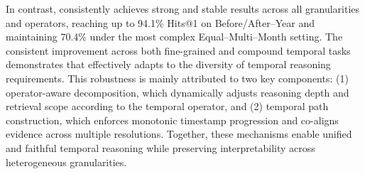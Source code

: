 In contrast, \mot consistently achieves strong and stable results across all granularities and operators, reaching up to 94.1\% Hits@1 on Before/After–Year and maintaining 70.4\% under the most complex Equal–Multi–Month setting.
The consistent improvement across both fine-grained and compound temporal tasks demonstrates that \mot effectively adapts to the diversity of temporal reasoning requirements.  
This robustness is mainly attributed to two key components: (1) operator-aware decomposition, which dynamically adjusts reasoning depth and retrieval scope according to the temporal operator, and (2) temporal path construction, which enforces monotonic timestamp progression and co-aligns evidence across multiple resolutions.
Together, these mechanisms enable unified and faithful temporal reasoning while preserving interpretability across heterogeneous granularities.




\newcommand{\badgeblue}[1]{\colorbox{BadgeBlue}{\strut\;\footnotesize #1\;}}
\newcommand{\badgegreen}[1]{\colorbox{BadgeGreen}{\strut\;\footnotesize #1\;}}
\newcommand{\badgeorange}[1]{\colorbox{BadgeOrange}{\strut\;\footnotesize #1\;}}
\newcommand{\badgegray}[1]{\colorbox{BadgeGray}{\strut\;\footnotesize #1\;}}

\setlength{\tabcolsep}{6pt}
\renewcommand{\arraystretch}{1.18}

